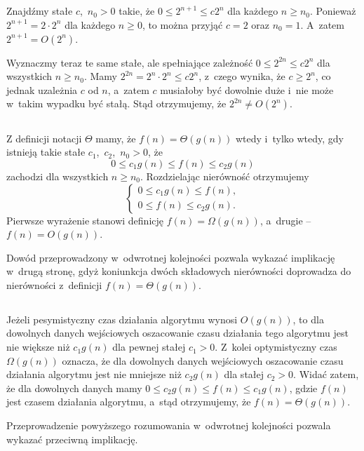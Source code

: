 \subsection{} %
Znajdźmy stałe $c$,~$n_0>0$ takie, że $0\le2^{n+1}\le c2^n$ dla każdego $n\ge n_0$. Ponieważ $2^{n+1}=2\cdot2^n$ dla każdego $n\ge0$, to można przyjąć $c=2$ oraz $n_0=1$. A~zatem $2^{n+1}=O(2^n)$.

Wyznaczmy teraz te same stałe, ale spełniające zależność $0\le2^{2n}\le c2^n$ dla wszystkich $n\ge n_0$. Mamy $2^{2n}=2^n\cdot2^n\le c2^n$, z~czego wynika, że $c\ge2^n$, co jednak uzależnia $c$ od $n$, a~zatem $c$ musiałoby być dowolnie duże i~nie może w~takim wypadku być stałą. Stąd otrzymujemy, że $2^{2n}\ne O(2^n)$.

\subsection{} %
Z definicji notacji $\Theta$ mamy, że $f(n)=\Theta(g(n))$ wtedy i~tylko wtedy, gdy istnieją takie stałe $c_1$,~$c_2$,~$n_0>0$, że
\[
	0 \le c_1g(n) \le f(n) \le c_2g(n)
\]
zachodzi dla wszystkich $n\ge n_0$. Rozdzielając nierówność otrzymujemy
\[
	\begin{cases}
		0 \le c_1g(n) \le f(n), \\
		0 \le f(n) \le c_2g(n).
	\end{cases}
\]
Pierwsze wyrażenie stanowi definicję $f(n)=\Omega(g(n))$, a~drugie -- $f(n)=O(g(n))$.

Dowód przeprowadzony w~odwrotnej kolejności pozwala wykazać implikację w~drugą stronę, gdyż koniunkcja dwóch składowych nierówności doprowadza do nierówności z~definicji $f(n)=\Theta(g(n))$.

\subsection{} %
Jeżeli pesymistyczny czas działania algorytmu wynosi $O(g(n))$, to dla dowolnych danych wejściowych oszacowanie czasu działania tego algorytmu jest nie większe niż $c_1g(n)$ dla pewnej stałej $c_1>0$. Z~kolei optymistyczny czas $\Omega(g(n))$ oznacza, że dla dowolnych danych wejściowych oszacowanie czasu działania algorytmu jest nie mniejsze niż $c_2g(n)$ dla stałej $c_2>0$. Widać zatem, że dla dowolnych danych mamy $0\le c_2g(n)\le f(n)\le c_1g(n)$, gdzie $f(n)$ jest czasem działania algorytmu, a~stąd otrzymujemy, że $f(n)=\Theta(g(n))$.

Przeprowadzenie powyższego rozumowania w~odwrotnej kolejności pozwala wykazać przeciwną implikację.

